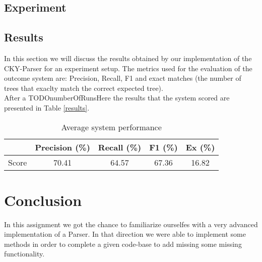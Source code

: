 \documentclass[11pt]{article}
\begin{document}
\subsection{Experiment}


\subsection{Results}
In this section we will discuss the results obtained by our implementation of the CKY-Parser for an experiment setup. The metrics used for the evaluation of the outcome system are: Precision, Recall, F1 and exact matches (the number of trees that exaclty match the correct expected tree).\\
After a TODOnumberOfRunsHere the results that the system scored are presented in Table \ref{results}.

\begin{center}\begin{table}
	\begin{tabular}{|c||c|c|c|c|}
	\hline
		 	  & Precision (\%) & Recall (\%) & F1 (\%) & Ex (\%)\\
	\hline
		Score & 70.41 		&	 64.57 		& 67.36 & 	16.82\\
	\hline
	\end{tabular}
	\caption{Average system performance}
	\end{table}
\label{results}\end{center}

\section{Conclusion}
In this assignment we got the chance to familiarize ourselfes with a very advanced implementation of a Parser. In that direction we were able to implement some methods in order to complete a given code-base to add missing some missing functionality. %
\end{document}
